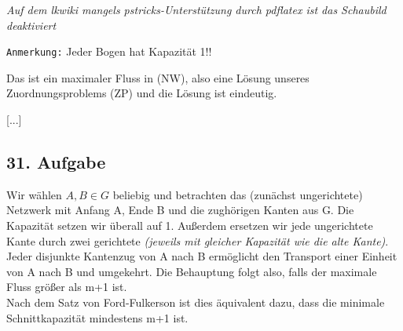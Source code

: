 \documentclass[a4paper,11pt,twoside,titlepage]{article}
\begin{document}
\begin{center}
\textit{ Auf dem lkwiki mangels pstricks-Unterstützung durch pdflatex ist das Schaubild deaktiviert}
\end{center}
%    
%   
%    
%    
%   

\texttt{Anmerkung:} Jeder Bogen hat Kapazität 1!!

Das ist ein maximaler Fluss in (NW), also eine Lösung unseres Zuordnungsproblems (ZP) und die Lösung ist eindeutig.

[...]

\subsection*{31. Aufgabe}

Wir wählen $A,B\in G$ beliebig und betrachten das (zunächst ungerichtete) Netzwerk mit Anfang A, Ende B und die zughörigen Kanten aus G. Die Kapazität setzen wir überall auf 1. Außerdem ersetzen wir jede ungerichtete Kante durch zwei gerichtete \textit{(jeweils mit gleicher Kapazität wie die alte Kante)}.\\
Jeder disjunkte Kantenzug von A nach B ermöglicht den Transport einer Einheit von A nach B und umgekehrt. Die Behauptung folgt also, falls der maximale Fluss größer als m+1 ist.\\
Nach dem Satz von Ford-Fulkerson ist dies äquivalent dazu, dass die minimale Schnittkapazität mindestens m+1 ist.
\end{document}

